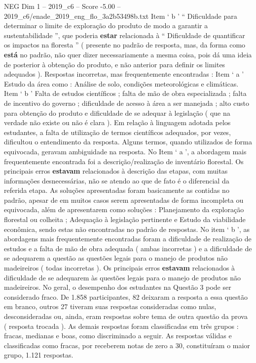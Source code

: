 \begin{textsample}{NEG Dim 1 – 2019\_c6 – Score -5.00 – 2019\_c6/enade\_2019\_eng\_flo\_3a2b53498b.txt}
Item ‘ b ’ “ Dificuldade para determinar o limite de exploração do produto de modo a garantir a sustentabilidade ”, que poderia \textbf{estar} relacionada à “ Dificuldade de quantificar os impactos na floresta ” ( presente no padrão de resposta, mas, da forma como \textbf{está} no padrão, não quer dizer necessariamente a mesma coisa, pois dá uma ideia de posterior à obtenção do produto, e não anterior para definir os limites adequados ).
Respostas incorretas, mas frequentemente encontradas : Item ‘ a ’ Estudo da área como : Análise de solo, condições meteorológicas e climáticas.
Item ‘ b ’ Falta de estudos científicos ; falta de mão de obra especializada ; falta de incentivo do governo ; dificuldade de acesso à área a ser manejada ; alto custo para obtenção do produto e dificuldade de se adequar à legislação ( que na verdade não existe ou não é clara ).
Em relação à linguagem adotada pelos estudantes, a falta de utilização de termos científicos adequados, por vezes, dificultou o entendimento da resposta.
Alguns termos, quando utilizados de forma equivocada, geravam ambiguidade na resposta.
No Item ‘ a ’, a abordagem mais frequentemente encontrada foi a descrição/realização de inventário florestal.
Os principais erros \textbf{estavam} relacionados à descrição das etapas, com muitas informações desnecessárias, não se atendo ao que de fato é o diferencial da referida etapa.
As soluções apresentadas foram basicamente as contidas no padrão, apesar de em muitos casos serem apresentadas de forma incompleta ou equivocada, além de apresentarem como soluções : Planejamento da exploração florestal ou colheita ; Adequação à legislação pertinente e Estudo da viabilidade econômica, sendo estas não encontradas no padrão de respostas.
No item ‘ b ’, as abordagens mais frequentemente encontradas foram a dificuldade de realização de estudos e a falta de mão de obra adequada ( ambas incorretas ) e a dificuldade de se adequarem a questão as questões legais para o manejo de produtos não madeireiros ( todas incorretas ).
Os principais erros \textbf{estavam} relacionados à dificuldade de se adequarem às questões legais para o manejo de produtos não madeireiros.
No geral, o desempenho dos estudantes na Questão 3 pode ser considerado fraco.
De 1.858 participantes, 82 deixaram a resposta a essa questão em branco, outros 27 tiveram suas respostas consideradas como nulas, desconsideradas ou, ainda, eram respostas sobre tema de outra questão da prova ( resposta trocada ).
As demais respostas foram classificadas em três grupos : fracas, medianas e boas, como discriminado a seguir.
As respostas válidas e classificadas como fracas, por receberem notas de zero a 30, constituíram o maior grupo, 1.121 respostas.

\end{textsample}
